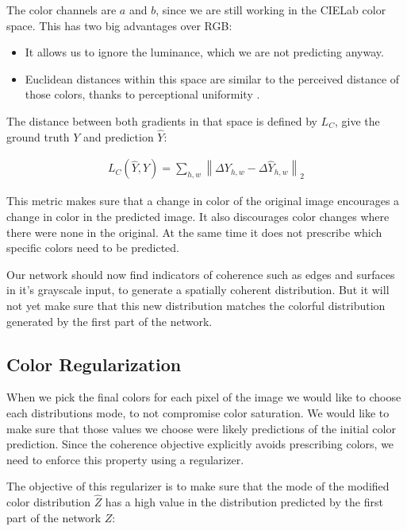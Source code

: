 \documentclass[11pt]{article}
\begin{document}
The color channels are $a$ and $b$, since we are still working in the CIELab color space. This has two big advantages over RGB:
\begin{itemize}
    \item It allows us to ignore the luminance, which we are not predicting anyway.
    \item Euclidean distances within this space are similar to the perceived distance of those colors, thanks to perceptional uniformity \cite{paschos2001perceptually,johnson2016perceptual}.
\end{itemize}

The distance between both gradients in that space is defined by $L_C$, give the ground truth $Y$ and prediction $\hat{Y}$:

\begin{align}
    L_C(\hat{Y}, Y) = \sum_{h, w}{\left\lVert \Delta Y_{h,w} - \Delta \hat{Y}_{h,w}\right\rVert_2}
\end{align}

This metric makes sure that a change in color of the original image encourages a change in color in the predicted image. It also discourages color changes where there were none in the original. At the same time it does not prescribe which specific colors need to be predicted.

Our network should now find indicators of coherence such as edges and surfaces in it's grayscale input, to generate a spatially coherent distribution. But it will not yet make sure that this new distribution matches the colorful distribution generated by the first part of the network.

\subsection{Color Regularization}
\label{chap:regularizer}

When we pick the final colors for each pixel of the image we would like to choose each distributions mode, to not compromise color saturation. We would like to make sure that those values we choose were likely predictions of the initial color prediction. Since the coherence objective explicitly avoids prescribing colors, we need to enforce this property using a regularizer.

The objective of this regularizer is to make sure that the mode of the modified color distribution $\hat{Z}$ has a high value in the distribution predicted by the first part of the network $Z$:
\end{document}
